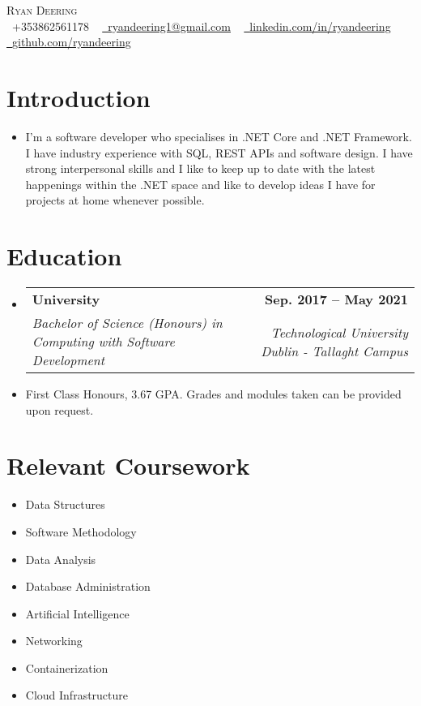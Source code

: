 \documentclass[letterpaper,11pt]{article}
\makeatletter
\newcommand{\resumeSubheading}[4]{
  \vspace{-2pt}\item
    \begin{tabular*}{1.0\textwidth}[t]{l@{\extracolsep{\fill}}r}
      \textbf{#1} & \textbf{\small #2} \\
      \textit{\small#3} & \textit{\small #4} \\
    \end{tabular*}\vspace{-7pt}
}
\newcommand{\resumeSubHeadingListStart}{\begin{itemize}[leftmargin=0.0in, label={}]}
\newcommand{\resumeSubHeadingListEnd}{\end{itemize}}
\makeatother
\begin{document}
\begin{center}
	{\Huge \scshape Ryan Deering} \\ \vspace{4pt}
	\small \raisebox{-0.1\height}\faPhone\ +353862561178 ~ \href{mailto:ryandeering1@gmail.com}{\raisebox{-0.2\height}\faEnvelope\  \underline{ryandeering1@gmail.com}} ~ 
	\href{https://www.linkedin.com/in/ryandeering/}{\raisebox{-0.2\height}\faLinkedin\ \underline{linkedin.com/in/ryandeering}}  ~
	\href{https://github.com/ryandeering}{\raisebox{-0.2\height}\faGithub\ \underline{github.com/ryandeering}}
	\vspace{-8pt}
\end{center}

\vspace{1pt}
\section{Introduction}
\resumeSubHeadingListStart
\item {I'm a software developer who specialises in .NET Core and .NET Framework. I have industry experience with SQL, REST APIs and software design. I have strong interpersonal skills and I like to keep up to date with the latest happenings within the .NET space and like to develop ideas I have for projects at home whenever possible. }
\resumeSubHeadingListEnd

\section{Education}
\resumeSubHeadingListStart
\resumeSubheading
{University}{Sep. 2017 -- May 2021}
{Bachelor of Science (Honours) in Computing with Software Development}{Technological University Dublin - Tallaght Campus}
\item {First Class Honours, 3.67 GPA. Grades and modules taken can be provided upon request.}
\resumeSubHeadingListEnd

\section{Relevant Coursework}
\begin{multicols}{4}
	\begin{itemize}[itemsep=-5pt, parsep=3pt]
		\item\small Data Structures
		\item Software Methodology
		\item Data Analysis
		\item Database Administration
		\item Artificial Intelligence
		\item Networking
		\item Containerization 
		\item Cloud Infrastructure
	\end{itemize}
\end{multicols}
\vspace*{1.6\multicolsep}
\end{document}
